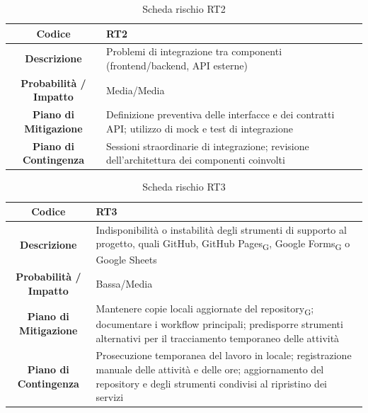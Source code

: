 \begin{table}[H]
	\centering
	\renewcommand{\arraystretch}{1.3}
	\begin{tabularx}{\textwidth}{|c|X|}
		\hline
		\textbf{Codice} & \textbf{RT2} \\
		\hline
		\textbf{Descrizione} & Problemi di integrazione tra componenti (frontend/backend, API esterne) \\
		\hline
		\textbf{Probabilità / Impatto} & Media/Media \\
		\hline
		\textbf{Piano di Mitigazione} & Definizione preventiva delle interfacce e dei contratti API; utilizzo di mock e test di integrazione \\
		\hline
		\textbf{Piano di Contingenza} & Sessioni straordinarie di integrazione; revisione dell'architettura dei componenti coinvolti \\
		\hline
	\end{tabularx}
	\caption{Scheda rischio RT2}
\end{table}

\begin{table}[H]
	\centering
	\renewcommand{\arraystretch}{1.3}
	\begin{tabularx}{\textwidth}{|c|X|}
		\hline
		\textbf{Codice} & \textbf{RT3} \\
		\hline
		\textbf{Descrizione} & Indisponibilità o instabilità degli strumenti di supporto al progetto, quali GitHub, GitHub Pages\textsubscript{G}, Google Forms\textsubscript{G} o Google Sheets \\
		\hline
		\textbf{Probabilità / Impatto} & Bassa/Media \\
		\hline
		\textbf{Piano di Mitigazione} & Mantenere copie locali aggiornate del repository\textsubscript{G}; documentare i workflow principali; predisporre strumenti alternativi per il tracciamento temporaneo delle attività \\
		\hline
		\textbf{Piano di Contingenza} & Prosecuzione temporanea del lavoro in locale; registrazione manuale delle attività e delle ore; aggiornamento del repository e degli strumenti condivisi al ripristino dei servizi \\
		\hline
	\end{tabularx}
	\caption{Scheda rischio RT3}
\end{table}

